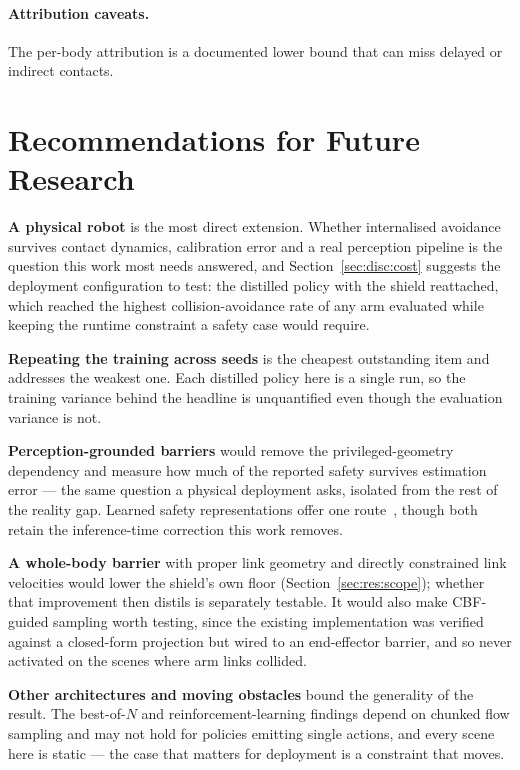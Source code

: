\paragraph{Attribution caveats.}
The per-body attribution is a documented lower bound that can miss delayed or indirect contacts.

\section{Recommendations for Future Research}\label{sec:conc:future}

\textbf{A physical robot} is the most direct extension. Whether internalised avoidance survives
contact dynamics, calibration error and a real perception pipeline is the question this work most
needs answered, and Section~\ref{sec:disc:cost} suggests the deployment configuration to test: the
distilled policy with the shield reattached, which reached the highest collision-avoidance rate of
any arm evaluated while keeping the runtime constraint a safety case would require.

\textbf{Repeating the training across seeds} is the cheapest outstanding item and addresses the
weakest one. Each distilled policy here is a single run, so the training variance behind the
headline is unquantified even though the evaluation variance is not.

\textbf{Perception-grounded barriers} would remove the privileged-geometry dependency and measure
how much of the reported safety survives estimation error --- the same question a physical
deployment asks, isolated from the rest of the reality gap. Learned safety representations offer
one route~\cite{meng2024conbat,sun2025lpb}, though both retain the inference-time correction this
work removes.

\textbf{A whole-body barrier} with proper link geometry and directly constrained link velocities
would lower the shield's own floor (Section~\ref{sec:res:scope}); whether that improvement then
distils is separately testable. It would also make CBF-guided sampling worth testing, since the
existing implementation was verified against a closed-form projection but wired to an
end-effector barrier, and so never activated on the scenes where arm links collided.

\textbf{Other architectures and moving obstacles} bound the generality of the result. The
best-of-$N$ and reinforcement-learning findings depend on chunked flow sampling and may not hold for
policies emitting single actions, and every scene here is static --- the case that matters for
deployment is a constraint that moves.

